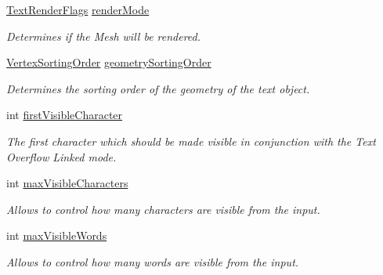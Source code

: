 \begin{DoxyCompactItemize}
\mbox{\hyperlink{namespace_t_m_pro_ac5a571bdd8e4873a73f2c05b62feff0e}{Text\+Render\+Flags}} \mbox{\hyperlink{class_t_m_pro_1_1_t_m_p___text_a784fe87428c11962474464f4c1602b0e}{render\+Mode}}
\begin{DoxyCompactList}\small\item\em Determines if the Mesh will be rendered. \end{DoxyCompactList}\item 
\mbox{\hyperlink{namespace_t_m_pro_a29c2b2e41c29850d1bc0760ac64b1ee0}{Vertex\+Sorting\+Order}} \mbox{\hyperlink{class_t_m_pro_1_1_t_m_p___text_af3c95939c35cbe809cf749ea7c879251}{geometry\+Sorting\+Order}}
\begin{DoxyCompactList}\small\item\em Determines the sorting order of the geometry of the text object. \end{DoxyCompactList}\item 
int \mbox{\hyperlink{class_t_m_pro_1_1_t_m_p___text_aae7cd2f640ffd5936f7e8a09d95a221d}{first\+Visible\+Character}}
\begin{DoxyCompactList}\small\item\em The first character which should be made visible in conjunction with the Text Overflow Linked mode. \end{DoxyCompactList}\item 
int \mbox{\hyperlink{class_t_m_pro_1_1_t_m_p___text_a3acb105723b8b2f70a392135f26dfbaf}{max\+Visible\+Characters}}
\begin{DoxyCompactList}\small\item\em Allows to control how many characters are visible from the input. \end{DoxyCompactList}\item 
int \mbox{\hyperlink{class_t_m_pro_1_1_t_m_p___text_ab96b06fb8776bb977d6d816ab849561e}{max\+Visible\+Words}}
\begin{DoxyCompactList}\small\item\em Allows to control how many words are visible from the input. \end{DoxyCompactList}\item 

\end{DoxyCompactItemize}
